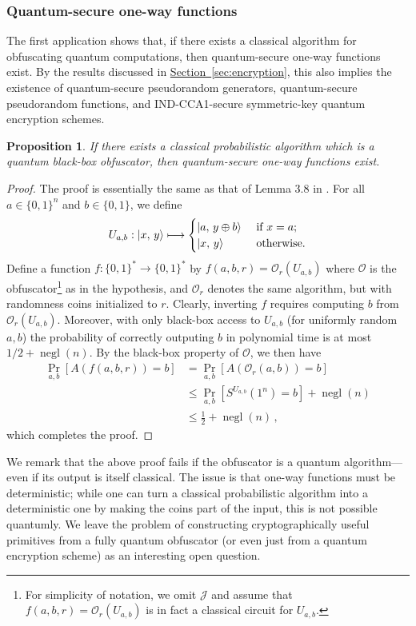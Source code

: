 \documentclass[envcountsame]{llncs}
\numberwithin{equation}{section}
\newtheorem{prop}{Proposition}
\newcommand{\opn}{\operatorname}
\newcommand{\expref}[2]{\texorpdfstring{\hyperref[#2]{#1~\ref{#2}}}{#1~\ref{#2}}}
\newcommand{\algo}{\mathcal}
\newcommand{\negl}{\opn{negl}}
\newcommand{\prob}{\opn{Pr}}
\begin{document}
\subsubsection{Quantum-secure one-way functions}

The first application shows that, if there exists a classical algorithm for obfuscating quantum computations, then quantum-secure one-way functions exist. By the results discussed in \expref{Section}{sec:encryption}, this also implies the existence of quantum-secure pseudorandom generators, quantum-secure pseudorandom functions, and IND-CCA1-secure symmetric-key quantum encryption schemes.

\begin{prop}
If there exists a classical probabilistic algorithm which is a quantum black-box obfuscator, then quantum-secure one-way functions exist.
\end{prop}
\begin{proof}
The proof is essentially the same as that of Lemma 3.8 in \cite{BGIRSVY12}. For all $a \in \{0, 1\}^n$ and $b \in \{0, 1\}$, we define 
$$
U_{a, b} : {\left\vert{x,\, y}\right\rangle} \longmapsto
\begin{cases}
{\left\vert{a,\, y \oplus b}\right\rangle} &\text{ if } x = a;\\
{\left\vert{x,\, y}\right\rangle} &\text{ otherwise}.
\end{cases}
$$
Define a function $f : \{0, 1\}^* \rightarrow \{0, 1\}^*$ by $f(a, b, r) = \algo O_r(U_{a, b})$ where $\algo O$ is the obfuscator\footnote{For simplicity of notation, we omit $\algo J$ and assume that $f(a, b, r) = \algo O_r(U_{a, b})$ is in fact a classical circuit for $U_{a, b}$.} as in the hypothesis, and $\algo O_r$ denotes the same algorithm, but with randomness coins initialized to $r$. Clearly, inverting $f$ requires computing $b$ from $\algo O_r(U_{a, b})$. Moreover, with only black-box access to $U_{a, b}$ (for uniformly random $a, b$) the probability of correctly outputing $b$ in polynomial time is at most $1/2 + \negl(n)$.  By the black-box property of $\mathcal O$, we then have
\begin{align*}
\prob_{a, b} [ A(f(a, b, r)) = b] 
&= \prob_{a, b} [ A(\mathcal O_r(a, b)) = b ]\\
&\leq \prob_{a, b} \left[ S^{U_{a, b}}(1^n) = b\right] + \negl(n)\\
&\leq \frac{1}{2} + \negl(n)\,,
\end{align*}
which completes the proof.
\end{proof}

We remark that the above proof fails if the obfuscator is a quantum algorithm---even if its output is itself classical. The issue is that one-way functions must be deterministic; while one can turn a classical probabilistic algorithm into a deterministic one by making the coins part of the input, this is not possible quantumly. We leave the problem of constructing cryptographically useful primitives from a fully quantum obfuscator (or even just from a quantum encryption scheme) as an interesting open question. 
\end{document}
